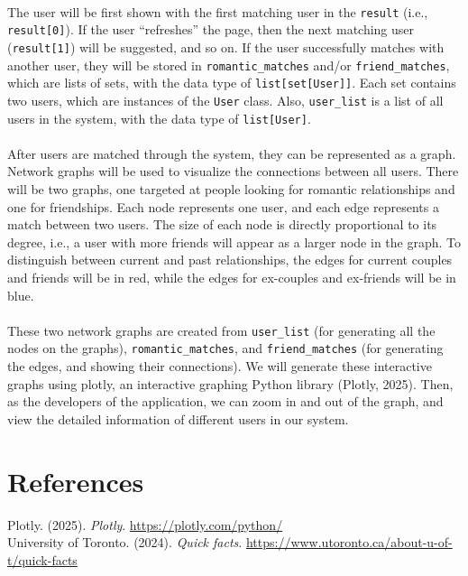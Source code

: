 \documentclass[fontsize=11pt]{article}
\begin{document}
\\
The user will be first shown with the first matching user in the \texttt{result}  (i.e., \texttt{result[0]}).
If the user “refreshes” the page, then the next matching user (\texttt{result[1]}) will be suggested, and so on.
If the user successfully matches with another user, they will be stored in \texttt{romantic\_matches} and/or \texttt{friend\_matches},
which are lists of sets, with the data type of \texttt{list[set[User]]}.
Each set contains two users, which are instances of the \texttt{User} class.
Also, \texttt{user\_list} is a list of all users in the system, with the data type of \texttt{list[User]}.
\\
\\
After users are matched through the system, they can be represented as a graph.
Network graphs will be used to visualize the connections between all users.
There will be two graphs, one targeted at people looking for romantic relationships and one for friendships.
Each node represents one user, and each edge represents a match between two users.
The size of each node is directly proportional to its degree, i.e., a user with more friends will appear as a larger node in the graph.
To distinguish between current and past relationships, the edges for current couples and friends will be in red, while the edges for ex-couples and ex-friends will be in blue.
\\
\\
These two network graphs are created from \texttt{user\_list} (for generating all the nodes on the graphs),
\texttt{romantic\_matches}, and \texttt{friend\_matches} (for generating the edges, and showing their connections).
We will generate these interactive graphs using plotly, an interactive graphing Python library (Plotly, 2025).
Then, as the developers of the application, we can zoom in and out of the graph, and view the detailed information of different users in our system.

\section*{References}

Plotly. (2025). \textit{Plotly}.
\url{https://plotly.com/python/}
\\
University of Toronto. (2024). \textit{Quick facts}.
\url{https://www.utoronto.ca/about-u-of-t/quick-facts}


\end{document}
